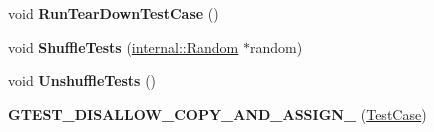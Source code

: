 \begin{DoxyCompactItemize}
void {\bfseries Run\+Tear\+Down\+Test\+Case} ()
\item 
\mbox{\label{classtesting_1_1_test_case_ac26160e2aeb3d8c86b611843c5abdb29}} 
void {\bfseries Shuffle\+Tests} (\hyperlink{classtesting_1_1internal_1_1_random}{internal\+::\+Random} $\ast$random)
\item 
\mbox{\label{classtesting_1_1_test_case_ad54a66cd65b4420c960d6db79b7cadf6}} 
void {\bfseries Unshuffle\+Tests} ()
\item 
\mbox{\label{classtesting_1_1_test_case_a00a4ea337b43015c71874ece0de58db7}} 
{\bfseries G\+T\+E\+S\+T\+\_\+\+D\+I\+S\+A\+L\+L\+O\+W\+\_\+\+C\+O\+P\+Y\+\_\+\+A\+N\+D\+\_\+\+A\+S\+S\+I\+G\+N\+\_\+} (\hyperlink{classtesting_1_1_test_case}{Test\+Case})
\end{DoxyCompactItemize}
